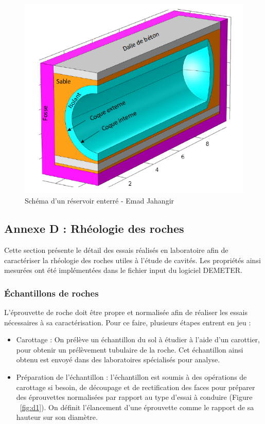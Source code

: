 \documentclass[11pt,french,a4paper]{article}
\begin{document}
\begin{figure}[h]
\centering
\includegraphics[width=.8\linewidth]{image/annexe/reservoir_ent/reservoir3D.png}
\caption{Schéma d'un réservoir enterré - Emad Jahangir}
\end{figure}

\FloatBarrier
\subsection*{Annexe D : Rhéologie des roches} 
Cette section présente le détail des essais réalisés en laboratoire afin de caractériser la rhéologie des roches utiles à l’étude de cavités. 
Les propriétés ainsi mesurées ont été implémentées dans le fichier input du logiciel DEMETER. 

\subsubsection*{Échantillons de roches}

L’éprouvette de roche doit être propre et normalisée afin de réaliser les essais nécessaires à sa caractérisation. 
Pour ce faire, plusieurs étapes entrent en jeu : 
\begin{itemize}
\item Carottage : On prélève un échantillon du sol à étudier à l’aide d’un carottier, pour obtenir un prélèvement tubulaire de la roche. Cet échantillon ainsi obtenu est envoyé dans des laboratoires spécialisés pour analyse. 
\item
Préparation de l’échantillon : l'échantillon est soumis à des opérations de carottage si besoin, de découpage et de rectification des faces pour préparer des éprouvettes normalisées par rapport au type d'essai à conduire (Figure ~\ref{fig:d1}). On définit l’élancement d’une éprouvette comme le rapport de sa hauteur sur son diamètre.
\end{itemize}
\end{document}
